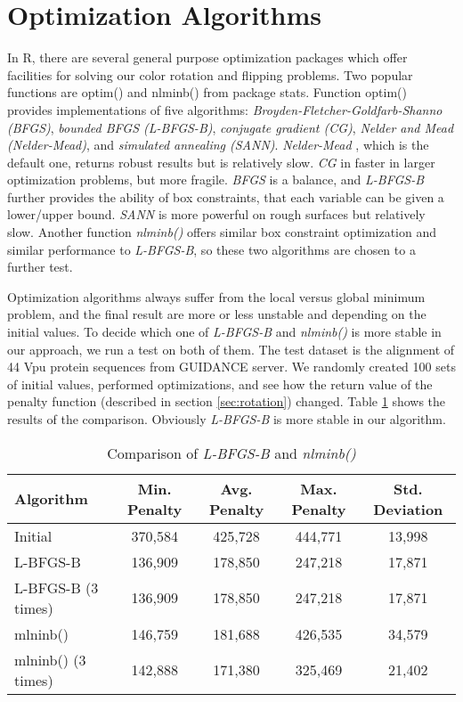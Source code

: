 \section{Optimization Algorithms}

In R, there are several general purpose optimization packages which offer facilities for solving our color rotation and flipping problems. Two popular functions are optim() and nlminb() from package stats. Function optim() provides implementations of five algorithms: \emph{Broyden-Fletcher-Goldfarb-Shanno (BFGS)}, \emph{bounded BFGS (L-BFGS-B)}, \emph{conjugate gradient (CG)}, \emph{Nelder and Mead (Nelder-Mead)}, and \emph{simulated annealing (SANN)}. \emph{Nelder-Mead} \cite{Nelder:1965aa}, which is the default one, returns robust results but is relatively slow. \emph{CG} \cite{Fletcher:1964aa} in faster in larger optimization problems, but more fragile. \emph{BFGS} is a balance, and \emph{L-BFGS-B} further provides the ability of box constraints, that each variable can be given a lower/upper bound. \emph{SANN} \cite{Belisle:1992aa} is more powerful on rough surfaces but relatively slow. Another function \emph{nlminb()} offers similar box constraint optimization and similar performance to \emph{L-BFGS-B}, so these two algorithms are chosen to a further test.

Optimization algorithms always suffer from the local versus global minimum problem, and the final result are more or less unstable and depending on the initial values. To decide which one of \emph{L-BFGS-B} and \emph{nlminb()} is more stable in our approach, we run a test on both of them. The test dataset is the alignment of 44 Vpu protein sequences from GUIDANCE server. \cite{Penn:2010ab} We randomly created 100 sets of initial values, performed optimizations, and see how the return value of the penalty function (described in section \ref{sec:rotation}) changed. Table \ref{tab:optim-comp} shows the results of the comparison. Obviously \emph{L-BFGS-B} is more stable in our algorithm.

\begin{table}[hb]
\caption{Comparison of \emph{L-BFGS-B} and \emph{nlminb()}}\label{tab:optim-comp}\centering\small
\begin{tabular}{lcccc} \toprule
  Algorithm           & Min. Penalty  & Avg. Penalty  & Max. Penalty  & Std. Deviation  \\ \hline
  Initial             & 370,584       & 425,728       & 444,771       & 13,998          \\
  L-BFGS-B            & 136,909       & 178,850       & 247,218       & 17,871          \\
  L-BFGS-B (3 times)  & 136,909       & 178,850       & 247,218       & 17,871          \\
  mlninb()            & 146,759       & 181,688       & 426,535       & 34,579          \\
  mlninb() (3 times)  & 142,888       & 171,380       & 325,469       & 21,402          \\ \bottomrule
\end{tabular}
\end{table}

